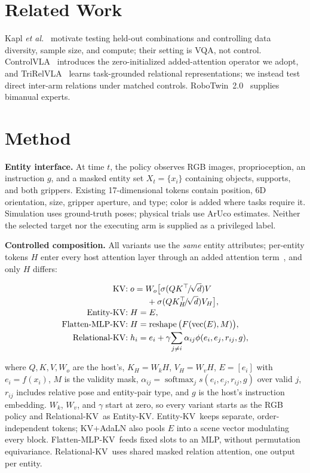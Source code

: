 \documentclass[letterpaper,10pt,conference]{ieeeconf}
\newcommand{\ekv}{Entity-KV}
\newcommand{\fkv}{Flatten-MLP-KV}
\newcommand{\rkv}{Relational-KV}
\begin{document}
\section{Related Work}
\label{sec:related}

Kapl \emph{et al.}~\cite{kapl2026} motivate testing held-out combinations and controlling data diversity, sample size, and compute; their setting is VQA, not control. ControlVLA~\cite{li2025controlvla} introduces the zero-initialized added-attention operator we adopt, and TriRelVLA~\cite{zhou2026trirel} learns task-grounded relational representations; we instead test direct inter-arm relations under matched controls. RoboTwin~2.0~\cite{chen2026robotwin} supplies bimanual experts.

\section{Method}
\label{sec:method}

\textbf{Entity interface.}
At time $t$, the policy observes RGB images, proprioception, an instruction $g$, and a masked entity set $X_t=\{x_i\}$ containing objects, supports, and both grippers. Existing 17-dimensional tokens contain position, 6D orientation, size, gripper aperture, and type; color is added where tasks require it. Simulation uses ground-truth poses; physical trials use ArUco estimates. Neither the selected target nor the executing arm is supplied as a privileged label.

\textbf{Controlled composition.}
All variants use the \emph{same} entity attributes; per-entity tokens $H$ enter every host attention layer through an added attention term~\cite{li2025controlvla}, and only $H$ differs:

\begin{align}
\text{KV:}\;
&o=W_o\big[\sigma(QK^{\top}\!/\!\sqrt{d})V\notag\\[-2pt]
&\qquad{}+\sigma(QK_H^{\top}\!/\!\sqrt{d})V_H\big],\notag\\[-2pt]
\text{\ekv:}\;
&H=E,\notag\\[-2pt]
\text{\fkv:}\;
&H=\operatorname{reshape}
\big(F(\operatorname{vec}(E),M)\big),\notag\\[-2pt]
\text{\rkv:}\;
&h_i=e_i+\gamma\!\sum_{j\neq i}
\alpha_{ij}\phi(e_i,e_j,r_{ij},g),
\label{eq:rel}
\end{align}

where $Q,K,V,W_o$ are the host's, $K_H=W_kH$, $V_H=W_vH$, $E=[e_i]$ with $e_i=f(x_i)$, $M$ is the validity mask, $\alpha_{ij}=\operatorname{softmax}_j s(e_i,e_j,r_{ij},g)$ over valid $j$, $r_{ij}$ includes relative pose and entity-pair type, and $g$ is the host's instruction embedding. $W_k$, $W_v$, and $\gamma$ start at zero, so every variant starts as the RGB policy and \rkv\ as \ekv. \ekv\ keeps separate, order-independent tokens; KV+AdaLN also pools $E$ into a scene vector modulating every block. \fkv\ feeds fixed slots to an MLP, without permutation equivariance. \rkv\ uses shared masked relation attention, one output per entity.
\end{document}
